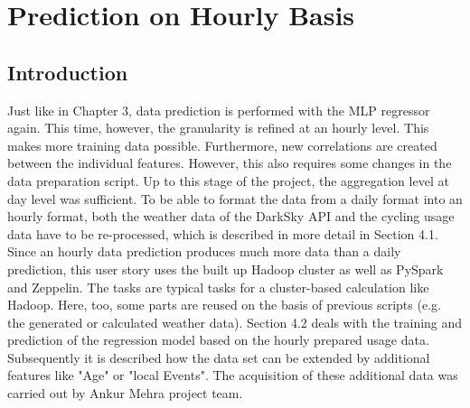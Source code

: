 
\section{Prediction on Hourly Basis}
\subsection{Introduction}\label{intro_hourly}
Just like in Chapter 3, data prediction is performed with the MLP regressor again. This time, however, the granularity is refined at an hourly level. This makes more training data possible. Furthermore, new correlations are created between the individual features. However, this also requires some changes in the data preparation script. Up to this stage of the project, the aggregation level at day level was sufficient. To be able to format the data from a daily format into an hourly format, both the weather data of the DarkSky API and the cycling usage data have to be re-processed, which is described in more detail in Section 4.1.
Since an hourly data prediction produces much more data than a daily prediction, this user story uses the built up Hadoop cluster as well as PySpark and Zeppelin. The tasks are typical tasks for a cluster-based calculation like Hadoop. Here, too, some parts are reused on the basis of previous scripts (e.g. the generated or calculated weather data).
Section 4.2 deals with the training and prediction of the regression model based on the hourly prepared usage data. Subsequently it is described how the data set can be extended by additional features like "Age" or "local Events". The acquisition of these additional data was carried out by Ankur Mehra project team. 
